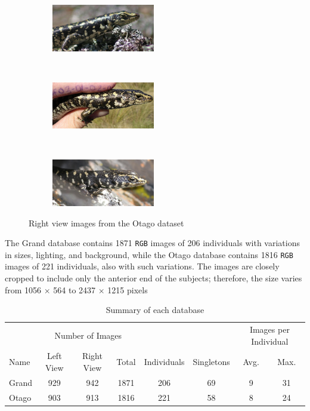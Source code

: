 \begin{figure}[htb]
  \centering
  \begin{subfigure}[t]{0.31\textwidth}
      \centering
      \includegraphics[width=4.5cm]{dataset/general/otago_R2}
  \end{subfigure}%
  ~
  \begin{subfigure}[t]{0.31\textwidth}
      \centering
      \includegraphics[width=4.5cm]{dataset/general/otago_R1}
  \end{subfigure}
  ~
  \begin{subfigure}[t]{0.31\textwidth}
      \centering
      \includegraphics[width=4.5cm]{dataset/general/otago_R3}
  \end{subfigure}
  \captionsetup{justification=centering}
  \caption{Right view images from the Otago dataset}
  \label{fig:otago_right} %
\end{figure}

The Grand database contains 1871 \texttt{RGB} images of 206 individuals with
variations in sizes, lighting, and background, while the Otago database
contains 1816 \texttt{RGB} images of 221 individuals, also with such
variations. The images are closely cropped to include only the anterior end of
the subjects; therefore, the size varies from 1056 $\times$ 564 to 2437
$\times$ 1215 pixels

\begin{table}[htb]
\captionsetup{justification=centering}
  \caption{Summary of each database}
  \label{tab:database_summary} %
  \centering
  \begin{tabular}{lccccccc}
    \toprule
    & \multicolumn{3}{c}{Number of Images} & & &
        \multicolumn{2}{c}{Images per Individual} \\
    \cmidrule{2-4}
    \cmidrule{7-8}
    Name & Left View & Right View & Total & Individuals & Singletons & Avg.
        & Max. \\
    \midrule
    Grand & 929 & 942 & 1871 & 206  & 69 & 9 & 31 \\
    Otago & 903 & 913 & 1816 & 221  & 58 & 8 & 24 \\
    \bottomrule
  \end{tabular}
\end{table}


